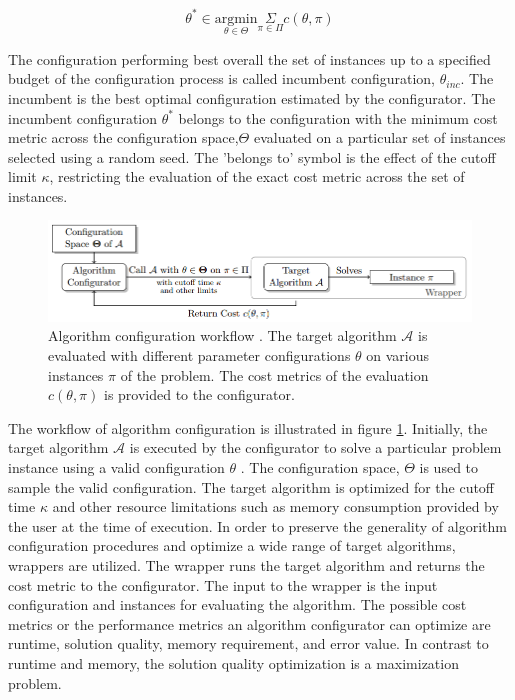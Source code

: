 \begin{equation}
    \theta^* \in \underset{\theta\in\Theta}{\mathrm{argmin}} \underset{\pi \in \Pi}{\Sigma} c(\theta,\pi) 
\end{equation}

The configuration performing best overall the set of instances up to a specified budget of the configuration process is called incumbent configuration, $\theta_{inc}$. The incumbent is the best optimal configuration estimated by the configurator. The incumbent configuration $\theta^*$ belongs to the configuration with the minimum cost metric across the configuration space,$\Theta$ evaluated on a particular set of instances selected using a random seed. The 'belongs to' symbol is the effect of the cutoff limit $\kappa$, restricting the evaluation of the exact cost metric across the set of instances.

\begin{figure}[!ht]
\centering
\includegraphics[width=\textwidth]{images/AC_workflow.png}
\captionsetup{justification=justified}
\caption[Algorithm configuration workflow]{Algorithm configuration workflow \cite{Pitfalls}. The target algorithm $\mathcal{A}$ is evaluated with different parameter configurations $\theta$ on various instances $\pi$ of the problem. The cost metrics of the evaluation $c(\theta,\pi)$ is provided to the configurator.}
\label{Fig:ACworkflow}
\end{figure}

The workflow of algorithm configuration is illustrated in figure \ref{Fig:ACworkflow}. Initially, the target algorithm $\mathcal{A}$ is executed by the configurator to solve a particular problem instance using a valid configuration $\theta$ \cite{Pitfalls}. The configuration space, $\Theta$ is used to sample the valid configuration. The target algorithm is optimized for the cutoff time $\kappa$ and other resource limitations such as memory consumption provided by the user at the time of execution. In order to preserve the generality of algorithm configuration procedures and optimize a wide range of target algorithms, wrappers are utilized. The wrapper runs the target algorithm and returns the cost metric to the configurator. The input to the wrapper is the input configuration and instances for evaluating the algorithm. The possible cost metrics or the performance metrics an algorithm configurator can optimize are runtime, solution quality, memory requirement, and error value. In contrast to runtime and memory, the solution quality optimization is a maximization problem.

